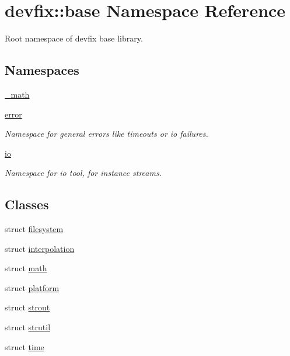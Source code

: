 \hypertarget{namespacedevfix_1_1base}{}\section{devfix\+:\+:base Namespace Reference}
\label{namespacedevfix_1_1base}


Root namespace of devfix base library.  


\subsection*{Namespaces}
\begin{DoxyCompactItemize}
\item 
 \hyperlink{namespacedevfix_1_1base_1_1__math}{\+\_\+math}
\item 
 \hyperlink{namespacedevfix_1_1base_1_1error}{error}
\begin{DoxyCompactList}\small\item\em Namespace for general errors like timeouts or io failures. \end{DoxyCompactList}\item 
 \hyperlink{namespacedevfix_1_1base_1_1io}{io}
\begin{DoxyCompactList}\small\item\em Namespace for io tool, for instance streams. \end{DoxyCompactList}\end{DoxyCompactItemize}
\subsection*{Classes}
\begin{DoxyCompactItemize}
\item 
struct \hyperlink{structdevfix_1_1base_1_1filesystem}{filesystem}
\item 
struct \hyperlink{structdevfix_1_1base_1_1interpolation}{interpolation}
\item 
struct \hyperlink{structdevfix_1_1base_1_1math}{math}
\item 
struct \hyperlink{structdevfix_1_1base_1_1platform}{platform}
\item 
struct \hyperlink{structdevfix_1_1base_1_1strout}{strout}
\item 
struct \hyperlink{structdevfix_1_1base_1_1strutil}{strutil}
\item 
struct \hyperlink{structdevfix_1_1base_1_1time}{time}
\end{DoxyCompactItemize}
